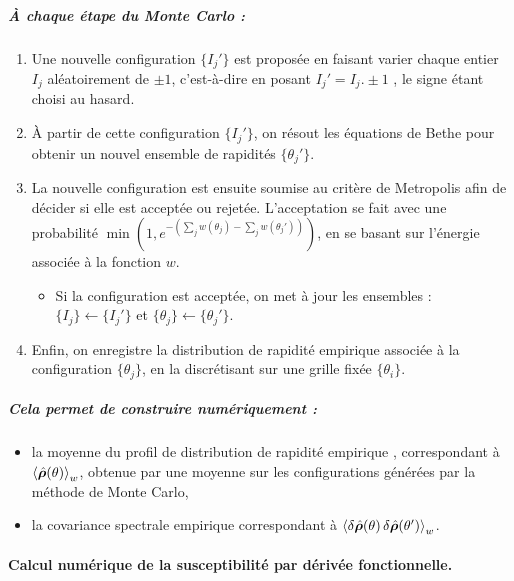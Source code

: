 \subparagraph{À chaque étape du Monte Carlo :}
\begin{enumerate}
    \item Une nouvelle configuration  \( \{I_j'\} \) est proposée en faisant varier chaque entier $I_j$ aléatoirement de $\pm 1$, c’est-à-dire en posant  $I_j' = I_j. \pm 1 $ , le signe étant choisi au hasard.
    \item À partir de cette configuration \( \{I_j'\} \), on résout les équations de Bethe pour obtenir un nouvel ensemble de rapidités \( \{ \theta_j' \} \).

	\item La nouvelle configuration est ensuite soumise au critère de Metropolis afin de décider si elle est acceptée ou rejetée. L’acceptation se fait avec une probabilité \( \min\left(1 , e^{- \left(\sum_j w(\theta_j) - \sum_j w(\theta_j')\right)}\right) \), en se basant sur l’énergie associée à la fonction \( w \).
	\begin{itemize}[label = $\bullet$]
    	\item Si la configuration est acceptée, on met à jour les ensembles : \( \{I_j\} \leftarrow \{I_j'\} \) et \( \{\theta_j\} \leftarrow \{\theta_j'\} \).
	\end{itemize}

	\item Enfin, on enregistre la distribution de rapidité empirique associée à la configuration \( \{\theta_j\} \), en la discrétisant sur une grille fixée \( \{\theta_i\} \).

\end{enumerate}


\subparagraph{Cela permet de construire numériquement :}

\begin{itemize}[label = $\bullet$]
    \item la moyenne du profil de distribution de rapidité empirique , correspondant à \( \braket{ \hat{\bm{\rho}}(\theta) }_w \), obtenue par une moyenne sur les configurations générées par la méthode de Monte Carlo,
    \item la covariance spectrale empirique correspondant à \( \braket{ \delta \hat{\bm{\rho}}(\theta) \, \delta \hat{\bm{\rho}}(\theta') }_w \).
\end{itemize}

\paragraph{Calcul numérique de la susceptibilité par dérivée fonctionnelle.}


